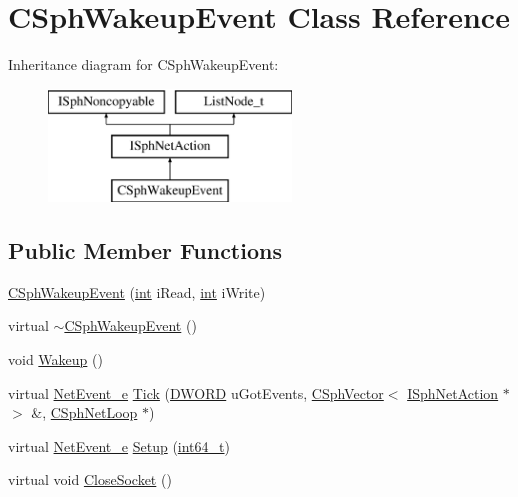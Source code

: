 \hypertarget{classCSphWakeupEvent}{\section{C\-Sph\-Wakeup\-Event Class Reference}
\label{classCSphWakeupEvent}
}
Inheritance diagram for C\-Sph\-Wakeup\-Event\-:\begin{figure}[H]
\begin{center}
\leavevmode
\includegraphics[height=3.000000cm]{classCSphWakeupEvent}
\end{center}
\end{figure}
\subsection*{Public Member Functions}
\begin{DoxyCompactItemize}
\item 
\hyperlink{classCSphWakeupEvent_ae1b8abad0c103d06ce5f1650e4bbc72d}{C\-Sph\-Wakeup\-Event} (\hyperlink{sphinxexpr_8cpp_a4a26e8f9cb8b736e0c4cbf4d16de985e}{int} i\-Read, \hyperlink{sphinxexpr_8cpp_a4a26e8f9cb8b736e0c4cbf4d16de985e}{int} i\-Write)
\item 
virtual \hyperlink{classCSphWakeupEvent_acea677a825f6a4f3b61cba790300bc5b}{$\sim$\-C\-Sph\-Wakeup\-Event} ()
\item 
void \hyperlink{classCSphWakeupEvent_a93d4e55babc009d802c35b61c064309d}{Wakeup} ()
\item 
virtual \hyperlink{searchd_8cpp_a1ee690eda2613fc797ecde8e4014fb9e}{Net\-Event\-\_\-e} \hyperlink{classCSphWakeupEvent_a3ecb6e5bafd102c6c132c505edd59fba}{Tick} (\hyperlink{sphinxstd_8h_a798af1e30bc65f319c1a246cecf59e39}{D\-W\-O\-R\-D} u\-Got\-Events, \hyperlink{classCSphVector}{C\-Sph\-Vector}$<$ \hyperlink{structISphNetAction}{I\-Sph\-Net\-Action} $\ast$ $>$ \&, \hyperlink{classCSphNetLoop}{C\-Sph\-Net\-Loop} $\ast$)
\item 
virtual \hyperlink{searchd_8cpp_a1ee690eda2613fc797ecde8e4014fb9e}{Net\-Event\-\_\-e} \hyperlink{classCSphWakeupEvent_a222ea13686866bbeada7e9605008d114}{Setup} (\hyperlink{sphinxstd_8h_a996e72f71b11a5bb8b3b7b6936b1516d}{int64\-\_\-t})
\item 
virtual void \hyperlink{classCSphWakeupEvent_aaaafd1d0f04b49b43200f2322623bd1f}{Close\-Socket} ()
\end{DoxyCompactItemize}
